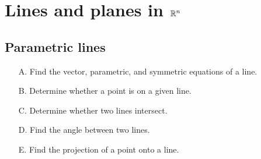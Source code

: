 \chapter{Lines and planes in \texorpdfstring{$\mathbb{R}^{n}$}{Rn}}

\section{Parametric lines}

\begin{outcome}
  \begin{enumerate}
  \item[A.] Find the vector, parametric, and symmetric equations of a line.
  \item[B.] Determine whether a point is on a given line.
  \item[C.] Determine whether two lines intersect.
  \item[D.] Find the angle between two lines.
  \item[E.] Find the projection of a point onto a line.
  \end{enumerate}
\end{outcome}

